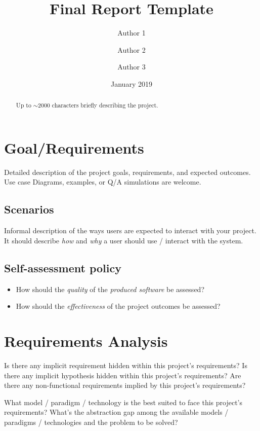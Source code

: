 \documentclass{scrartcl}
\title{\LARGE
    Final Report Template
}
\author{
    Author 1 \\ \emailaddr{author1@email.it}
    \and
    Author 2 \\ \emailaddr{author2@gmail.com}
    \and
    Author 3 \\ \emailaddr{author3@unibo.it}
}
\date{January 2019}
\begin{document}
\maketitle

\begin{abstract}
    Up to $\sim$2000 characters briefly describing the project.
\end{abstract}

\section{Goal/Requirements}\label{sec:goal/requirements}

Detailed description of the project goals, requirements, and expected outcomes.
%
Use case Diagrams, examples, or Q/A simulations are welcome.

\subsection{Scenarios}\label{subsec:scenarios}

Informal description of the ways users are expected to interact with your project.
%
It should describe \emph{how} and \emph{why} a user should use / interact with the system.

\subsection{Self-assessment policy}\label{subsec:self-assessment-policy}

\begin{itemize}
    \item How should the \emph{quality} of the \emph{produced software} be assessed?

    \item How should the \emph{effectiveness} of the project outcomes be assessed?
\end{itemize}

\section{Requirements Analysis}\label{sec:requirements-analysis}

Is there any implicit requirement hidden within this project's requirements?
%
Is there any implicit hypothesis hidden within this project's requirements?
%
Are there any non-functional requirements implied by this project's requirements?

What model / paradigm / technology is the best suited to face this project's requirements?
%
What's the abstraction gap among the available models / paradigms / technologies and the problem to be solved?
\end{document}
